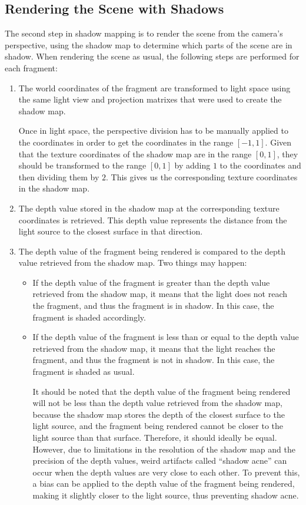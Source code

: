 \subsection{Rendering the Scene with Shadows}

The second step in shadow mapping is to render the scene from the camera's perspective, using the shadow map to determine which parts of the scene are in shadow. When rendering the scene as usual, the following steps are performed for each fragment:
\begin{enumerate}
    \item The world coordinates of the fragment are transformed to light space using the same light view and projection matrixes that were used to create the shadow map.
    
    Once in light space, the perspective division has to be manually applied to the coordinates in order to get the coordinates in the range $[-1,1]$. Given that the texture coordinates of the shadow map are in the range $[0,1]$, they should be transformed to the range $[0,1]$ by adding $1$ to the coordinates and then dividing them by $2$. This gives us the corresponding texture coordinates in the shadow map.
    \item The depth value stored in the shadow map at the corresponding texture coordinates is retrieved. This depth value represents the distance from the light source to the closest surface in that direction.
    \item The depth value of the fragment being rendered is compared to the depth value retrieved from the shadow map. Two things may happen:
    \begin{itemize}
        \item If the depth value of the fragment is greater than the depth value retrieved from the shadow map, it means that the light does not reach the fragment, and thus the fragment is in shadow. In this case, the fragment is shaded accordingly.
        \item If the depth value of the fragment is less than or equal to the depth value retrieved from the shadow map, it means that the light reaches the fragment, and thus the fragment is not in shadow. In this case, the fragment is shaded as usual.
        
        It should be noted that the depth value of the fragment being rendered will not be less than the depth value retrieved from the shadow map, because the shadow map stores the depth of the closest surface to the light source, and the fragment being rendered cannot be closer to the light source than that surface. Therefore, it should ideally be equal. However, due to limitations in the resolution of the shadow map and the precision of the depth values, weird artifacts called ``shadow acne'' can occur when the depth values are very close to each other. To prevent this, a bias can be applied to the depth value of the fragment being rendered, making it slightly closer to the light source, thus preventing shadow acne.
    \end{itemize}
\end{enumerate}

